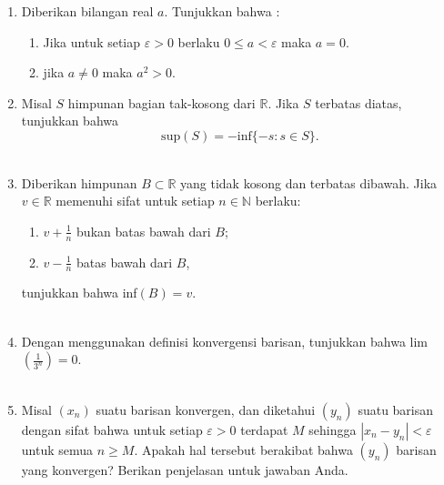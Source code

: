 \documentclass[10pt,openany,a4paper]{article}
\begin{document}
\begin{enumerate}
    \item Diberikan bilangan real $a$. Tunjukkan bahwa :
    \begin{enumerate}
        \item Jika untuk setiap $\varepsilon>0$ berlaku $0\leq a<\varepsilon$ maka $a=0$.
        \item jika $a\neq0$ maka $a^2>0$.
    \end{enumerate}
    \vspace{1cm}
    
    \item Misal $S$ himpunan bagian tak-kosong dari $\mathbb{R}$. Jika $S$ terbatas diatas, tunjukkan bahwa
    \[\textrm{sup}(S)=-\textrm{inf}\{-s:s\in S\}.\]\\

    \item Diberikan himpunan $B\subset\mathbb{R}$ yang tidak kosong dan terbatas dibawah. Jika $v\in\mathbb{R}$ memenuhi sifat untuk setiap $n\in\mathbb{N}$ berlaku:
    \begin{enumerate}[label=(\roman*)]
        \item $v+\frac{1}{n}$ bukan batas bawah dari $B$;
        \item $v-\frac{1}{n}$ batas bawah dari $B$,
    \end{enumerate}
    tunjukkan bahwa inf$(B)=v$.\\~\\

    \item Dengan menggunakan definisi konvergensi barisan, tunjukkan bahwa lim$(\frac{1}{3^n})=0$.\\~\\

    \item Misal $(x_n)$ suatu barisan konvergen, dan diketahui $(y_n)$ suatu barisan dengan sifat bahwa untuk setiap $\varepsilon>0$ terdapat $M$ sehingga $|x_n-y_n|<\varepsilon$ untuk semua $n\geq M$. Apakah hal tersebut berakibat bahwa $(y_n)$ barisan yang konvergen? Berikan penjelasan untuk jawaban Anda.
\end{enumerate}
\end{document}

